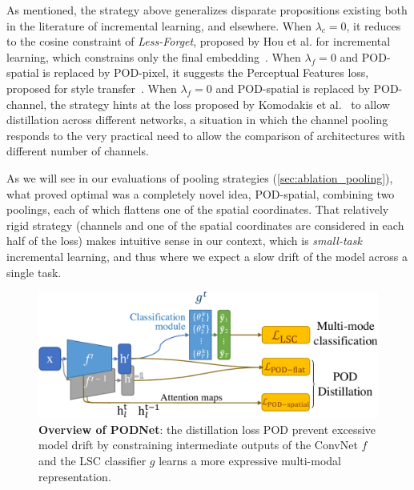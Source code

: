 As mentioned, the strategy above generalizes disparate propositions existing both in the literature
of incremental learning, and elsewhere. When $\lambda_{c}=0$, it reduces to the cosine constraint of
\textit{Less-Forget}, proposed by Hou et al. for incremental learning, which constrains only the
final embedding~\citep{hou2019ucir}. When $\lambda_{f}=0$ and POD-spatial is replaced by POD-pixel,
it suggests the Perceptual Features loss, proposed for style
transfer~\citep{johnson2016perceptual_losses}. When $\lambda_{f}=0$ and POD-spatial is replaced by
POD-channel, the strategy hints at the loss proposed by Komodakis et
al.~\citep{komodakis2017attention_residual_distillation} to allow distillation across different
networks, a situation in which the channel pooling responds to the very practical need to allow the
comparison of architectures with different number of channels.

As we will see in our evaluations of pooling strategies (\autoref{sec:ablation_pooling}), what
proved optimal was a completely novel idea, POD-spatial, combining two poolings, each of which
flattens one of the spatial coordinates. That relatively rigid strategy (channels and one of the
spatial coordinates are considered in each half of the loss) makes intuitive sense in our context,
which is \textit{small-task} incremental learning, and thus where we expect a slow drift of the
model across a single task.


\begin{figure}[t]
    \begin{center}
        \includegraphics[width=0.8\linewidth]{images/podnet/model}
    \end{center}
    \caption{\textbf{Overview of PODNet}: the distillation loss POD prevent excessive model drift by
        constraining intermediate outputs of the ConvNet $f$ and the LSC classifier $g$ learns a
        more expressive multi-modal representation.}
    \label{fig:model}
\end{figure}


